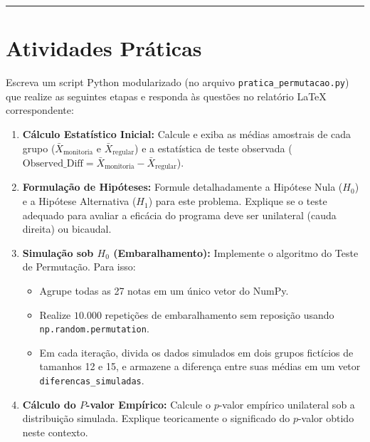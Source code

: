 \documentclass[12pt]{article}
\begin{document}
\vspace{0.3cm}
\hrule
\vspace{0.5cm}

\section*{Atividades Práticas}

Escreva um script Python modularizado (no arquivo \texttt{pratica\_permutacao.py}) que realize as seguintes etapas e responda às questões no relatório LaTeX correspondente:

\begin{enumerate}[label=\textbf{Tarefa \arabic*}]
    \item \textbf{Cálculo Estatístico Inicial:}
    Calcule e exiba as médias amostrais de cada grupo ($\bar{X}_{\text{monitoria}}$ e $\bar{X}_{\text{regular}}$) e a estatística de teste observada ($\text{Observed\_Diff} = \bar{X}_{\text{monitoria}} - \bar{X}_{\text{regular}}$).
    
    \item \textbf{Formulação de Hipóteses:}
    Formule detalhadamente a Hipótese Nula ($H_0$) e a Hipótese Alternativa ($H_1$) para este problema. Explique se o teste adequado para avaliar a eficácia do programa deve ser unilateral (cauda direita) ou bicaudal.
    
    \item \textbf{Simulação sob $H_0$ (Embaralhamento):}
    Implemente o algoritmo do Teste de Permutação. Para isso:
    \begin{itemize}
        \item Agrupe todas as 27 notas em um único vetor do NumPy.
        \item Realize $10.000$ repetições de embaralhamento sem reposição usando \lstinline|np.random.permutation|.
        \item Em cada iteração, divida os dados simulados em dois grupos fictícios de tamanhos 12 e 15, e armazene a diferença entre suas médias em um vetor \lstinline|diferencas_simuladas|.
    \end{itemize}
    
    \item \textbf{Cálculo do $P$-valor Empírico:}
    Calcule o $p$-valor empírico unilateral sob a distribuição simulada. Explique teoricamente o significado do $p$-valor obtido neste contexto.
    

\end{enumerate}
\end{document}
